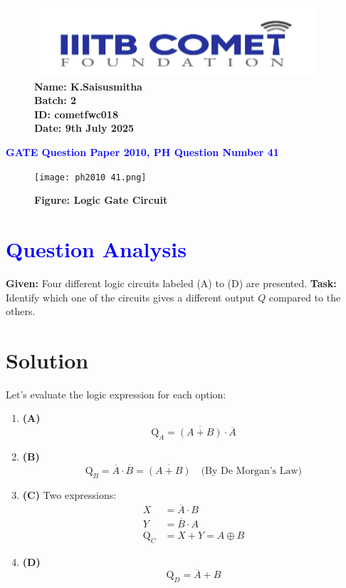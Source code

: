 \documentclass[twocolumn]{article}
\begin{document}
\begin{figure}[t]
    \includegraphics[width=\linewidth]{img3.png} %
        \textbf{Name: K.Saisusmitha} \\
    \textbf{Batch: 2} \\
    \textbf{ID: cometfwc018} \\
    \textbf{Date: 9th July 2025}
\end{figure}

\begin{center}
    {\LARGE \textbf{\textcolor{blue}{GATE Question Paper 2010, PH Question Number 41}}}
\end{center}

\vspace{1em}
\begin{figure}[h]
    \centering
    \texttt{[image: ph2010 41.png]}
        \caption*{\textbf{Figure: Logic Gate Circuit}}
\end{figure}

\section*{\textcolor{blue}{Question Analysis}}
\textbf{Given:} Four different logic circuits labeled (A) to (D) are presented.  
\textbf{Task:} Identify which one of the circuits gives a different output $Q$ compared to the others.

\section*{Solution}

Let’s evaluate the logic expression for each option:

\begin{enumerate}[label=\textbf{Option (\Alph*):}]
    \item \textbf{(A)}  
    \[
    \text{Q}_A = \overline{(A + B)} \cdot \overline{A}
    \]

    \item \textbf{(B)}  
    \[
    \text{Q}_B = \overline{A} \cdot \overline{B} = \overline{(A + B)} \quad \text{(By De Morgan's Law)}
    \]

    \item \textbf{(C)}  
    Two expressions:
    \begin{align*}
    X &= \overline{A} \cdot B \\
    Y &= \overline{B} \cdot A \\
    \text{Q}_C &= X + Y = A \oplus B
    \end{align*}

    \item \textbf{(D)}  
    \[
    \text{Q}_D = \overline{A} + B
    \]
\end{enumerate}
\end{document}
